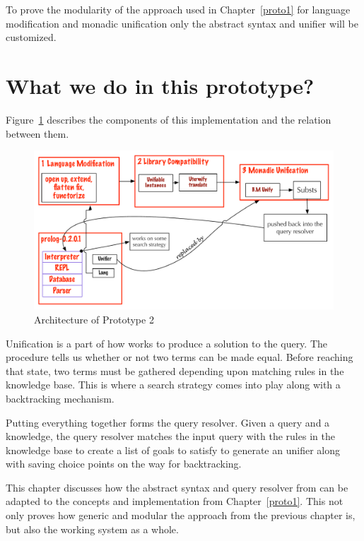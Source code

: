 \documentclass[thesis-solanki.tex]{subfiles}
\begin{document}
To prove the modularity of the approach used in Chapter~\ref{proto1} for language modification and monadic unification only the abstract syntax and unifier will be customized.

\section{What we do in this prototype?}

Figure~\ref{fig:architecture-proto-2} describes the components of this implementation and the relation between them.

\begin{figure}[H]
  \includegraphics[width=1\textwidth]{Prototype-2-diagram.pdf}
\vspace*{-1cm}
  \caption{Architecture of Prototype 2}
  \label{fig:architecture-proto-2}
\end{figure}


Unification is a part of how  works to produce a solution to the query. The  procedure
tells us whether or not two terms can be made equal. Before reaching that state, two terms must be gathered depending 
upon matching rules in the knowledge base. This is where a search strategy comes into play along with a backtracking mechanism.

Putting everything together forms the  query resolver.
Given a query and a knowledge, the query resolver matches the input query with the rules in the knowledge base to
create a list of goals to satisfy to generate an unifier along with saving choice points on the way for
backtracking.

This chapter discusses how the abstract syntax and query resolver from \cite{prolog-lib} can be adapted to
the concepts and implementation from Chapter~\ref{proto1}.
This not only proves how generic and modular the approach from the previous chapter is, but also the working  system
as a whole.
\end{document}
